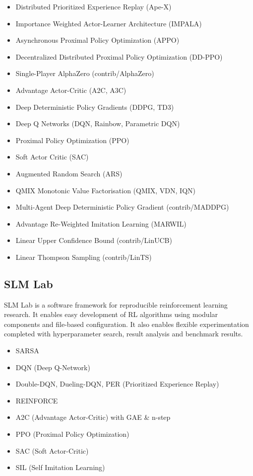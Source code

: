 \documentclass[letterpaper, 10 pt]{IEEEconf}
\begin{document}
\begin{itemize}
\item  Distributed Prioritized Experience Replay (Ape-X)
\item  Importance Weighted Actor-Learner Architecture (IMPALA)
\item  Asynchronous Proximal Policy Optimization (APPO)
\item  Decentralized Distributed Proximal Policy Optimization (DD-PPO)
\item  Single-Player AlphaZero (contrib/AlphaZero)
\item  Advantage Actor-Critic (A2C, A3C)
\item  Deep Deterministic Policy Gradients (DDPG, TD3)
\item  Deep Q Networks (DQN, Rainbow, Parametric DQN)
\item  Proximal Policy Optimization (PPO)
\item  Soft Actor Critic (SAC)
\item  Augmented Random Search (ARS)
\item  QMIX Monotonic Value Factorisation (QMIX, VDN, IQN)
\item  Multi-Agent Deep Deterministic Policy Gradient (contrib/MADDPG)
\item  Advantage Re-Weighted Imitation Learning (MARWIL)
\item  Linear Upper Confidence Bound (contrib/LinUCB)
\item  Linear Thompson Sampling (contrib/LinTS)
\end{itemize}

\subsection{SLM Lab~\cite{kenggraesser2017slmlab}}

SLM Lab is a software framework for reproducible reinforcement
learning research. It enables easy development of RL algorithms using
modular components and file-based configuration. It also enables
flexible experimentation completed with hyperparameter search, result
analysis and benchmark results.

\begin{itemize}
\item SARSA
\item DQN (Deep Q-Network)
\item Double-DQN, Dueling-DQN, PER (Prioritized Experience Replay)
\item REINFORCE
\item A2C (Advantage Actor-Critic) with GAE \& n-step
\item PPO (Proximal Policy Optimization)
\item SAC (Soft Actor-Critic)
\item SIL (Self Imitation Learning)
\end{itemize}
\end{document}
